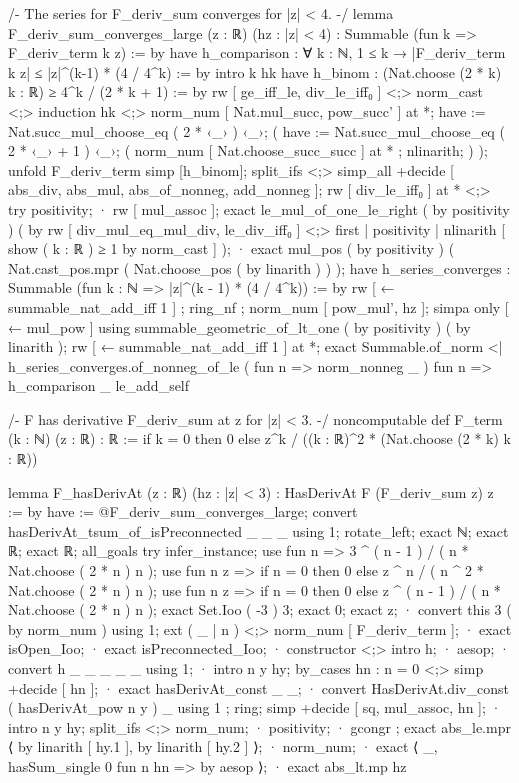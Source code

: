 /-
The series for F_deriv_sum converges for |z| < 4.
-/
lemma F_deriv_sum_converges_large (z : ℝ) (hz : |z| < 4) : Summable (fun k => F_deriv_term k z) := by
  have h_comparison : ∀ k : ℕ, 1 ≤ k → |F_deriv_term k z| ≤ |z|^(k-1) * (4 / 4^k) := by
    intro k hk
    have h_binom : (Nat.choose (2 * k) k : ℝ) ≥ 4^k / (2 * k + 1) := by
      rw [ ge_iff_le, div_le_iff₀ ] <;> norm_cast <;> induction hk <;> norm_num [ Nat.mul_succ, pow_succ' ] at *;
      have := Nat.succ_mul_choose_eq ( 2 * ‹_› ) ‹_›; ( have := Nat.succ_mul_choose_eq ( 2 * ‹_› + 1 ) ‹_›; ( norm_num [ Nat.choose_succ_succ ] at * ; nlinarith; ) );
    unfold F_deriv_term
    simp [h_binom];
    split_ifs <;> simp_all +decide [ abs_div, abs_mul, abs_of_nonneg, add_nonneg ];
    rw [ div_le_iff₀ ] at * <;> try positivity;
    · rw [ mul_assoc ];
      exact le_mul_of_one_le_right ( by positivity ) ( by rw [ div_mul_eq_mul_div, le_div_iff₀ ] <;> first | positivity | nlinarith [ show ( k : ℝ ) ≥ 1 by norm_cast ] );
    · exact mul_pos ( by positivity ) ( Nat.cast_pos.mpr ( Nat.choose_pos ( by linarith ) ) );
  have h_series_converges : Summable (fun k : ℕ => |z|^(k - 1) * (4 / 4^k)) := by
    rw [ ← summable_nat_add_iff 1 ] ; ring_nf ; norm_num [ pow_mul', hz ];
    simpa only [ ← mul_pow ] using summable_geometric_of_lt_one ( by positivity ) ( by linarith );
  rw [ ← summable_nat_add_iff 1 ] at *;
  exact Summable.of_norm <| h_series_converges.of_nonneg_of_le ( fun n => norm_nonneg _ ) fun n => h_comparison _ le_add_self

/-
F has derivative F_deriv_sum at z for |z| < 3.
-/
noncomputable def F_term (k : ℕ) (z : ℝ) : ℝ := if k = 0 then 0 else z^k / ((k : ℝ)^2 * (Nat.choose (2 * k) k : ℝ))

lemma F_hasDerivAt (z : ℝ) (hz : |z| < 3) : HasDerivAt F (F_deriv_sum z) z := by
  have := @F_deriv_sum_converges_large;
  convert hasDerivAt_tsum_of_isPreconnected _ _ _ using 1;
  rotate_left;
  exact ℕ;
  exact ℝ;
  exact ℝ;
  all_goals try infer_instance;
  use fun n => 3 ^ ( n - 1 ) / ( n * Nat.choose ( 2 * n ) n );
  use fun n z => if n = 0 then 0 else z ^ n / ( n ^ 2 * Nat.choose ( 2 * n ) n );
  use fun n z => if n = 0 then 0 else z ^ ( n - 1 ) / ( n * Nat.choose ( 2 * n ) n );
  exact Set.Ioo ( -3 ) 3;
  exact 0;
  exact z;
  · convert this 3 ( by norm_num ) using 1;
    ext ( _ | n ) <;> norm_num [ F_deriv_term ];
  · exact isOpen_Ioo;
  · exact isPreconnected_Ioo;
  · constructor <;> intro h;
    · aesop;
    · convert h _ _ _ _ _ using 1;
      · intro n y hy; by_cases hn : n = 0 <;> simp +decide [ hn ];
        · exact hasDerivAt_const _ _;
        · convert HasDerivAt.div_const ( hasDerivAt_pow n y ) _ using 1 ; ring;
          simp +decide [ sq, mul_assoc, hn ];
      · intro n y hy; split_ifs <;> norm_num;
        · positivity;
        · gcongr ; exact abs_le.mpr ⟨ by linarith [ hy.1 ], by linarith [ hy.2 ] ⟩;
      · norm_num;
      · exact ⟨ _, hasSum_single 0 fun n hn => by aesop ⟩;
      · exact abs_lt.mp hz

